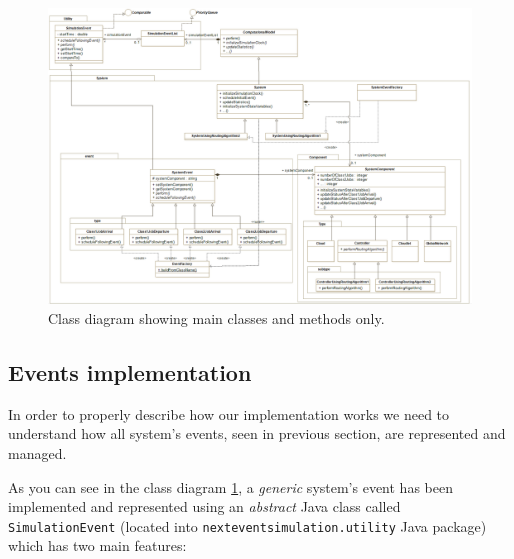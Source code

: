 \documentclass[10pt,a4paper]{article}
\begin{document}
\begin{figure}[H]
\includegraphics[width=\textwidth]{ClassDiagram}
\centering
\caption{Class diagram showing main classes and methods only.}

\label{fig:ClassDiagram}

\end{figure}


\subsection{Events implementation}

In order to properly describe how our implementation works we need to understand how all system's events, seen in previous section, are represented and managed.

As you can see in the class diagram \ref{fig:ClassDiagram}, a \textit{generic} system's event has been implemented and represented using an \textit{abstract} Java class called \texttt{SimulationEvent} (located into \texttt{nexteventsimulation.\-utility} Java package) which has two main features:
\end{document}
